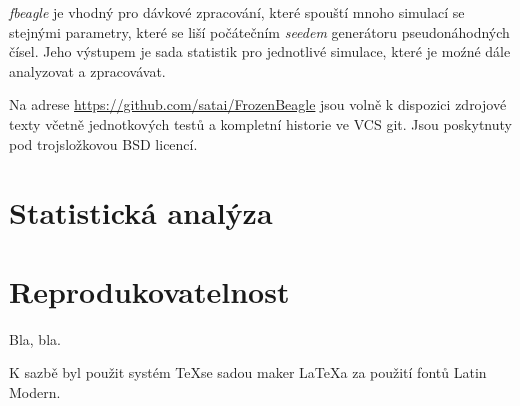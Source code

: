 \textit{fbeagle} je vhodný pro dávkové zpracování, které spouští mnoho simulací se stejnými parametry, které se liší počátečním \textit{seedem} generátoru pseudonáhodných čísel. Jeho výstupem je sada statistik pro jednotlivé simulace, které je moźné dále analyzovat a zpracovávat.

Na adrese \url {https://github.com/satai/FrozenBeagle} jsou volně k dispozici zdrojové texty včetně jednotkových testů a kompletní historie ve VCS git. Jsou poskytnuty pod trojsložkovou BSD licencí.

\section{Statistická analýza}

\section{Reprodukovatelnost}

Bla, bla.

K sazbě byl použit systém \TeX se sadou maker \LaTeX a za použití fontů Latin Modern.
